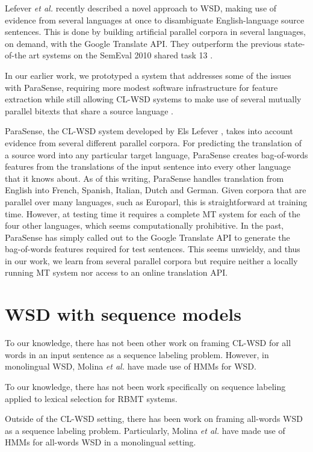 Lefever \textit{et al.} recently described a novel approach to WSD, making use
of evidence from several languages at once to disambiguate English-language
source sentences. This is done by building artificial parallel corpora in
several languages, on demand, with the Google Translate API. They outperform
the previous state-of-the art systems on the SemEval 2010 shared task 13
\cite{lefever-hoste-decock:2011:ACL-HLT2011}.

In our earlier work, we prototyped a system that addresses some of the issues
with ParaSense, requiring more modest software infrastructure for feature
extraction while still allowing CL-WSD systems to make use of several mutually
parallel bitexts that share a source language
\cite{rudnick-liu-gasser:2013:SemEval-2013}.

ParaSense, the CL-WSD system developed by Els Lefever
\cite{lefever-hoste-decock:2011:ACL-HLT2011}, takes into account evidence from
several different parallel corpora.
For predicting the translation of a source word into
any particular target language, ParaSense creates
bag-of-words features from the translations of the input sentence into every
other language that it knows about. As of this writing, ParaSense handles
translation from English into French, Spanish, Italian, Dutch and German.
Given corpora that are parallel over many languages, such as Europarl, this is
straightforward at
training time. However, at testing time it requires a complete MT system for
each of the four other languages, which seems computationally prohibitive. In
the past, ParaSense has simply called out to the Google Translate API to
generate the bag-of-words features required for test sentences. This seems
unwieldy, and thus in our work, we learn from several parallel corpora but
require neither a locally running MT system nor access to an online translation
API.

\section{WSD with sequence models}
To our knowledge, there has not been other work on framing CL-WSD for all words
in an input sentence as a sequence labeling problem. However, in monolingual
WSD, Molina \textit{et al.} \cite{DBLP:conf/iberamia/MolinaPS02} have made
use of HMMs for WSD. 

To our knowledge, there has not been work specifically on sequence labeling
applied to lexical selection for RBMT systems.

Outside of the CL-WSD setting, there has been work on framing all-words WSD as
a sequence labeling problem. Particularly, Molina \textit{et al.}
\cite{DBLP:conf/iberamia/MolinaPS02} have made use of HMMs for all-words
WSD in a monolingual setting.


